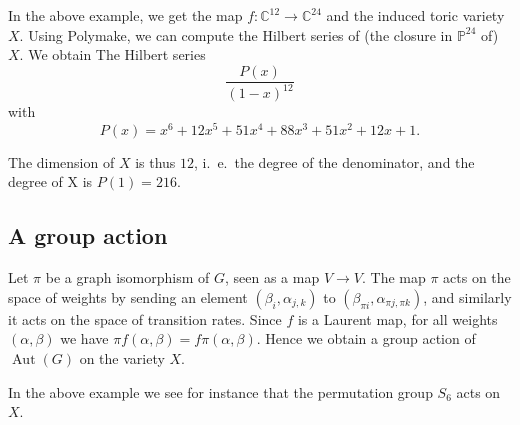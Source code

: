 In the above example, we get the map $f\colon \mathbb C^{12}\to \mathbb C^{24}$ and the induced toric variety $X$. Using Polymake, we can compute the Hilbert series of (the closure in $\mathbb P^{24}$ of) $X$. We obtain The Hilbert series
	\[\frac{P(x)}{(1-x)^{12}}\]
with \[P(x)=x^6 + 12x^5 + 51x^4 + 88x^3 + 51x^2 + 12x + 1.\]

The dimension of $X$ is thus $12$, i.\ e.\ the degree of the denominator, and the degree of X is $P(1)=216$.

\subsection*{A group action}
Let $\pi$ be a graph isomorphism of $G$, seen as a map $V\to V$. The map $\pi$ acts on the space of weights by sending an element $(\beta_i,\alpha_{j,k})$ to $(\beta_{\pi i},\alpha_{\pi{j},\pi{k}})$, and similarly it acts on the space of transition rates. Since $f$ is a Laurent map, for all weights $(\alpha,\beta)$ we have $\pi f (\alpha,\beta) = f \pi (\alpha, \beta)$. Hence we obtain a group action of $\operatorname{Aut}(G)$ on the variety $X$.

In the above example we see for instance that the permutation group $S_6$ acts on $X$.